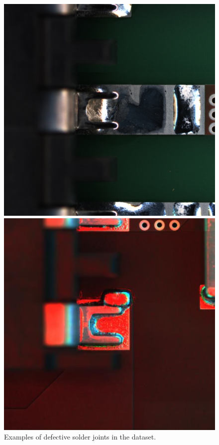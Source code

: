 \begin{figure}[ht!]
    \centering  
    \begin{minipage}{0.32\textwidth}
        \centering
        \includegraphics[width=\textwidth]{Images/Val_NG_BF2003043437_151_7_816_816_Color_origin.jpg} %
    \end{minipage}
    \begin{minipage}{0.32\textwidth}
        \centering
        \includegraphics[width=\textwidth]{Images/Val_NG_BF2003033542_223_32_471_471_Multi_origin.jpg} %
    \end{minipage}\hfill
    \caption{Examples of defective solder joints in the dataset.}
    \label{fig:dataset-NG}
\end{figure}

